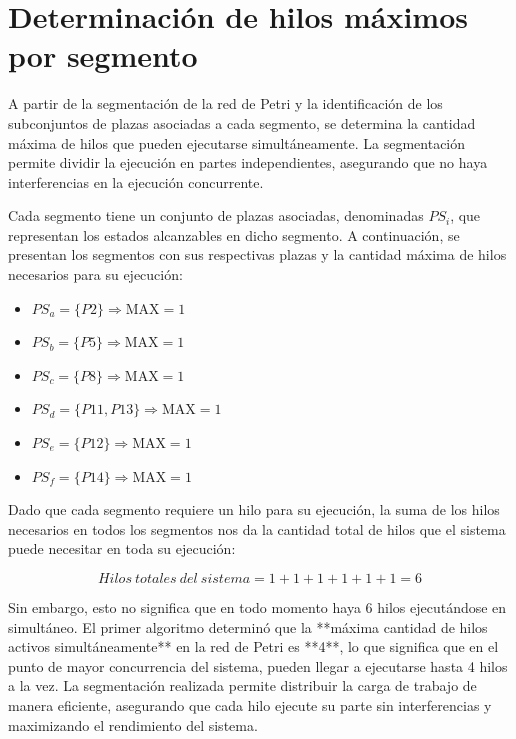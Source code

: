 \documentclass[12pt]{article}
\begin{document}
\section{Determinación de hilos máximos por segmento}

A partir de la segmentación de la red de Petri y la identificación de los subconjuntos de plazas asociadas a cada segmento, se determina la cantidad máxima de hilos que pueden ejecutarse simultáneamente. La segmentación permite dividir la ejecución en partes independientes, asegurando que no haya interferencias en la ejecución concurrente.

Cada segmento tiene un conjunto de plazas asociadas, denominadas \(PS_i\), que representan los estados alcanzables en dicho segmento. A continuación, se presentan los segmentos con sus respectivas plazas y la cantidad máxima de hilos necesarios para su ejecución:

\begin{itemize}
    \item \(PS_a = \{P2\} \Rightarrow \text{MAX} = 1\)
    \item \(PS_b = \{P5\} \Rightarrow \text{MAX} = 1\)
    \item \(PS_c = \{P8\} \Rightarrow \text{MAX} = 1\)
    \item \(PS_d = \{P11, P13\} \Rightarrow \text{MAX} = 1\)
    \item \(PS_e = \{P12\} \Rightarrow \text{MAX} = 1\)
    \item \(PS_f = \{P14\} \Rightarrow \text{MAX} = 1\)
\end{itemize}

Dado que cada segmento requiere un hilo para su ejecución, la suma de los hilos necesarios en todos los segmentos nos da la cantidad total de hilos que el sistema puede necesitar en toda su ejecución:

\[
Hilos\ totales\ del\ sistema = 1 + 1 + 1 + 1 + 1 + 1 = 6
\]

Sin embargo, esto no significa que en todo momento haya 6 hilos ejecutándose en simultáneo.  
El primer algoritmo determinó que la **máxima cantidad de hilos activos simultáneamente** en la red de Petri es **4**, lo que significa que en el punto de mayor concurrencia del sistema, pueden llegar a ejecutarse hasta 4 hilos a la vez.  
La segmentación realizada permite distribuir la carga de trabajo de manera eficiente, asegurando que cada hilo ejecute su parte sin interferencias y maximizando el rendimiento del sistema.
\end{document}
